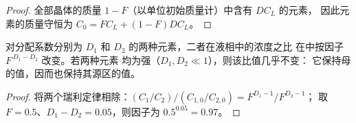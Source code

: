 \begin{proof}
全部晶体的质量 $1-F$（以单位初始质量计）中含有 $DC_L$ 的元素，
因此元素的质量守恒为 $C_0 = FC_L + (1-F)DC_L$。
\end{proof}

\begin{corollary}[不相容元素的比值]\label{cor:b2:magmatic-differentiation:ratio}
对分配系数分别为 $D_1$ 和 $D_2$ 的两种元素，二者在液相中的浓度之比
在中按因子 $F^{\,D_1-D_2}$ 改变。若两种元素
均为强（$D_1, D_2 \ll 1$），则该比值几乎不变：
它保持母的值，因而也保持其源区的值。
\end{corollary}

\begin{proof}
将两个瑞利定律相除：$(C_1/C_2)/(C_{1,0}/C_{2,0}) = F^{D_1-1}/F^{D_2-1}$；
取 $F = 0.5$、$D_1 - D_2 = 0.05$，则因子为 $0.5^{0.05} = 0.97$。
\end{proof}

